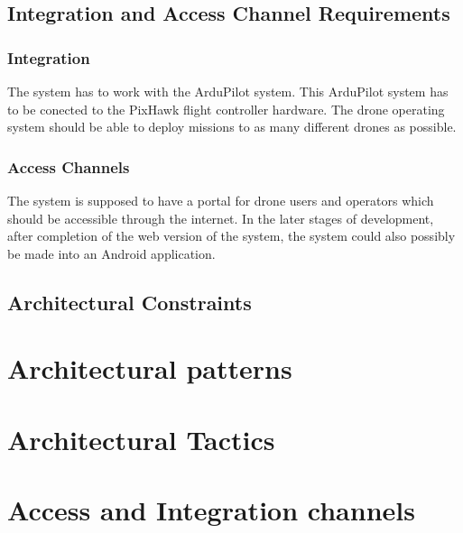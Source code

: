 \documentclass{article}
\begin{document}
		\subsection{Integration and Access Channel Requirements}%
		\subsubsection{Integration}
		The system has to work with the ArduPilot system. This ArduPilot system has to be conected to the PixHawk flight controller hardware. The drone operating system should be able to deploy missions to as many different drones as possible.
		\subsubsection{Access Channels}
		The system is supposed to have a portal for drone users and operators which should be accessible through the internet. In the later stages of development, after completion of the web version of the system, the system could also possibly be made into an Android application.
		\subsection{Architectural Constraints }%
	\section{Architectural patterns}%
	\section{Architectural Tactics}%
	\section{Access and Integration channels}%
\end{document}
